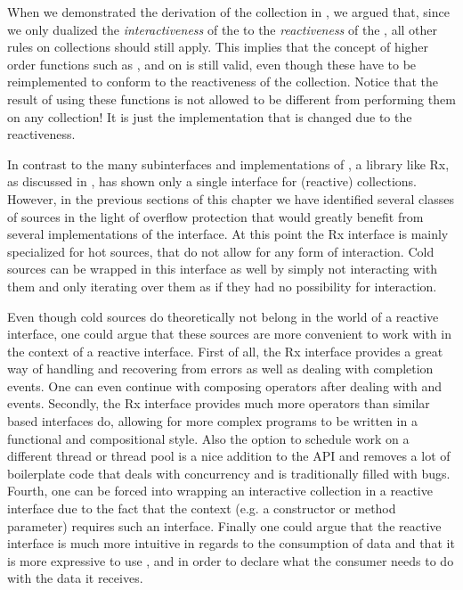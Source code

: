 When we demonstrated the derivation of the \obs collection in , we argued that, since we only dualized the \textit{interactiveness} of the \ieb to the \textit{reactiveness} of the \obs, all other rules on collections should still apply. This implies that the concept of higher order functions such as ,  and  on \ieb is still valid, even though these have to be reimplemented to conform to the reactiveness of the \obs collection. Notice that the result of using these functions is not allowed to be different from performing them on any \ieb collection! It is just the implementation that is changed due to the reactiveness.

In contrast to the many subinterfaces and implementations of \itb, a library like Rx, as discussed in , has shown only a single interface for (reactive) collections. However, in the previous sections of this chapter we have identified several classes of sources in the light of overflow protection that would greatly benefit from several implementations of the \obs interface. At this point the Rx interface is mainly specialized for hot sources, that do not allow for any form of interaction. Cold sources can be wrapped in this interface as well by simply not interacting with them and only iterating over them as if they had no possibility for interaction.

Even though cold sources do theoretically not belong in the world of a reactive interface, one could argue that these sources are more convenient to work with in the context of a reactive interface. First of all, the Rx interface provides a great way of handling and recovering from errors as well as dealing with completion events. One can even continue with composing operators after dealing with  and  events. Secondly, the Rx interface provides much more operators than similar \itb based interfaces do, allowing for more complex programs to be written in a functional and compositional style. Also the option to schedule work on a different thread or thread pool is a nice addition to the API and removes a lot of boilerplate code that deals with concurrency and is traditionally filled with bugs. Fourth, one can be forced into wrapping an interactive collection in a reactive interface due to the fact that the context (e.g. a constructor or method parameter) requires such an interface. Finally one could argue that the reactive interface is much more intuitive in regards to the consumption of data and that it is more expressive to use ,  and  in order to declare what the consumer needs to do with the data it receives.

